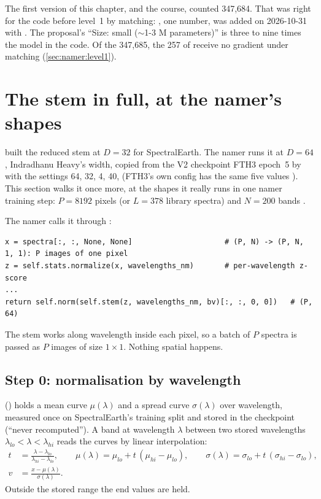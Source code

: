 \begin{sourcenote}
The first version of this chapter, and the course, counted 347,684. That was right for the code before level~1 by
matching: , one number, was added on 2026-10-31 with . The proposal's ``Size: small
($\sim$1-3 M parameters)'' is three to nine times the model in the code. Of the 347,685, the 257 of
 receive no gradient under matching (\cref{sec:namer:level1}).
\end{sourcenote}

\section{The stem in full, at the namer's shapes}\label{sec:namer:stem}

 built the reduced stem at $D=32$ for SpectralEarth. The namer runs it at
$D=64$, Indradhanu Heavy's width, copied from the V2 checkpoint FTH3 epoch~5 by  with the
settings  64,  32,  4,  40,
  (FTH3's own config has the same five values
). This section walks it once more,
at the shapes it really runs in one namer training step: $P=8192$ pixels (or $L=378$ library spectra) and $N=200$
bands \tagA.

The namer calls it through :
\begin{lstlisting}
x = spectra[:, :, None, None]                     # (P, N) -> (P, N, 1, 1): P images of one pixel
z = self.stats.normalize(x, wavelengths_nm)       # per-wavelength z-score
...
return self.norm(self.stem(z, wavelengths_nm, bv)[:, :, 0, 0])   # (P, 64)
\end{lstlisting}
The stem works along wavelength inside each pixel, so a batch of $P$ spectra is passed as $P$ images of size
$1\times1$. Nothing spatial happens.

\subsection{Step 0: normalisation by wavelength}

 () holds a mean curve $\mu(\lambda)$ and a spread curve
$\sigma(\lambda)$ over wavelength, measured once on SpectralEarth's training split and stored in the checkpoint
(``never recomputed''). A band at wavelength $\lambda$ between two stored wavelengths $\lambda_{lo}<\lambda<\lambda_{hi}$
reads the curves by linear interpolation:
\begin{align}
t &= \frac{\lambda-\lambda_{lo}}{\lambda_{hi}-\lambda_{lo}}, \qquad
\mu(\lambda)=\mu_{lo}+t\,(\mu_{hi}-\mu_{lo}), \qquad \sigma(\lambda)=\sigma_{lo}+t\,(\sigma_{hi}-\sigma_{lo}),\\
v &= \frac{x-\mu(\lambda)}{\sigma(\lambda)} .
\end{align}
Outside the stored range the end values are held.

